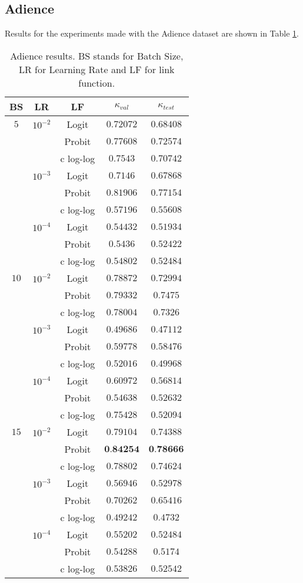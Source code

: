 \documentclass[10pt, a4paper, titlepage, twocolumn]{article}
\begin{document}
	\subsection{Adience}
	Results for the experiments made with the Adience dataset are shown in Table \ref{table:Adienceresults}.
	
	\begin{table}[ht]
		\footnotesize
		\centering
		\begin{tabular}{ccc|cc}
			BS & LR & LF & $\kappa_{val}$ & $\kappa_{test}$\\\hline\addlinespace[0.05cm]
			$5$ & $10^{-2}$ & Logit & $0.72072$ & $0.68408$\\
			& & Probit & $0.77608$ & $0.72574$\\
			& & c log-log & $0.7543$ & $0.70742$\\
			& $10^{-3}$ & Logit & $0.7146$ & $0.67868$\\
			& & Probit & $0.81906$ & $0.77154$\\
			& & c log-log & $0.57196$ & $0.55608$\\
			& $10^{-4}$ & Logit & $0.54432$ & $0.51934$\\
			& & Probit & $0.5436$ & $0.52422$\\
			& & c log-log & $0.54802$ & $0.52484$\\
			$10$ & $10^{-2}$ & Logit & $0.78872$ & $0.72994$\\
			& & Probit & $0.79332$ & $0.7475$\\
			& & c log-log & $0.78004$ & $0.7326$\\
			& $10^{-3}$ & Logit & $0.49686$ & $0.47112$\\
			& & Probit & $0.59778$ & $0.58476$\\
			& & c log-log & $0.52016$ & $0.49968$\\
			& $10^{-4}$ & Logit & $0.60972$ & $0.56814$\\
			& & Probit & $0.54638$ & $0.52632$\\
			& & c log-log & $0.75428$ & $0.52094$\\
			$15$ & $10^{-2}$ & Logit & $0.79104$ & $0.74388$\\
			& & Probit & $\textbf{0.84254}$ & $\textbf{0.78666}$\\
			& & c log-log & $0.78802$ & $0.74624$\\
			& $10^{-3}$ & Logit & $0.56946$ & $0.52978$\\
			& & Probit & $0.70262$ & $0.65416$\\
			& & c log-log & $0.49242$ & $0.4732$\\
			& $10^{-4}$ & Logit & $0.55202$ & $0.52484$\\
			& & Probit & $0.54288$ & $0.5174$\\
			& & c log-log & $0.53826$ & $0.52542$
		\end{tabular}
		\caption{Adience results. BS stands for Batch Size, LR for Learning Rate and LF for link function.}
		\label{table:Adienceresults}
	\end{table}
	
\end{document}
